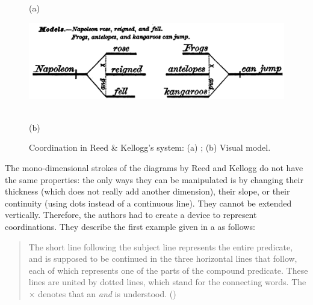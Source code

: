 \documentclass[english,output=paper,colorlinks,citecolor=brown]{../langscibook}
\begin{document}
\begin{figure}
    (a) \hspace{1em} \begin{minipage}[c]{.75\textwidth}\includegraphics[width=\textwidth]{figures/04/ReedKellog3.png}\end{minipage}\bigskip\\
    (b) \hspace{1em} 
    \caption{Coordination in Reed \& Kellogg’s system: (a) \citeyear[47]{ReedBrainerd1879}; (b) Visual model.\label{fig:4:8}}    
\end{figure}


The mono-dimensional strokes of the diagrams by Reed and Kellogg do not have the same properties: the only ways they can be manipulated is by changing their thickness (which does not really add another dimension), their slope, or their continuity (using dots instead of a continuous line). They cannot be extended vertically. Therefore, the authors had to create a device to represent coordinations. They describe the first example given in a as follows:

\begin{quote}
The short line following the subject line represents the entire predicate, and is supposed to be continued in the three horizontal lines that follow, each of which represents one of the parts of the compound predicate. These lines are united by dotted lines, which stand for the connecting words. The × denotes that an \textit{and} is understood. (\citealt[47--48]{ReedBrainerd1879})
\end{quote}
\end{document}
